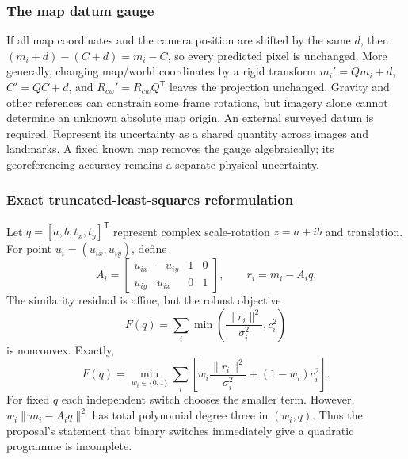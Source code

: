 \documentclass[11pt,a4paper]{article}
\numberwithin{equation}{section}
\begin{document}
\subsubsection{The map datum gauge}

If all map coordinates and the camera position are shifted by the same
$d$, then $(m_i+d)-(C+d)=m_i-C$, so every predicted pixel is unchanged.
More generally, changing map/world coordinates by a rigid transform
$m_i'=Qm_i+d$, $C'=QC+d$, and $R_{cw}'=R_{cw}Q^{\mathsf T}$ leaves
the projection unchanged. Gravity and other references can constrain
some frame rotations, but imagery alone cannot determine an unknown
absolute map origin. An external surveyed datum is required.
Represent its uncertainty as a shared quantity across images and
landmarks. A fixed known map removes the gauge algebraically; its
georeferencing accuracy remains a separate physical uncertainty.

\subsubsection{Exact truncated-least-squares reformulation}

Let $q=[a,b,t_x,t_y]^{\mathsf T}$ represent complex scale-rotation
$z=a+ib$ and translation. For point $u_i=(u_{ix},u_{iy})$, define
\begin{equation}
 A_i=\begin{bmatrix}u_{ix}&-u_{iy}&1&0\\
                       u_{iy}&u_{ix}&0&1\end{bmatrix},\qquad
 r_i=m_i-A_iq.
\end{equation}
The similarity residual is affine, but the robust objective
\begin{equation}
 F(q)=\sum_i\min\left(\frac{\|r_i\|^2}{\sigma_i^2},c_i^2\right)
\end{equation}
is nonconvex. Exactly,
\begin{equation}
 F(q)=\min_{w_i\in\{0,1\}}\sum_i
       \left[w_i\frac{\|r_i\|^2}{\sigma_i^2}+(1-w_i)c_i^2\right].
\end{equation}
For fixed $q$ each independent switch chooses the smaller term. However,
$w_i\|m_i-A_iq\|^2$ has total polynomial degree three in $(w_i,q)$.
Thus the proposal's statement that binary switches immediately give a
quadratic programme is incomplete.
\end{document}
